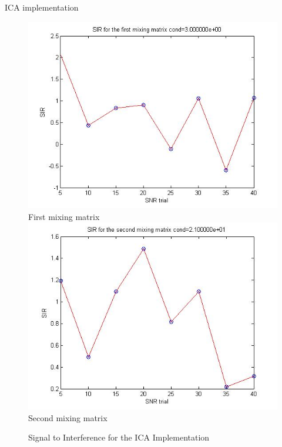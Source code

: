 \documentclass[t,12pt,english
\ifx\beamermode\undefined\else,\beamermode\fi
]{beamer}
\begin{document}
\begin{frame}{ICA implementation}

\begin{figure}[!htbp]
%
\centering
\includegraphics[width=1\textwidth]{1.jpg}\\
\tiny{First mixing matrix}\label{a1}
\endminipage\hfill
{}%
\centering
\includegraphics[width=1\textwidth]{2.jpg}\\
\tiny{Second mixing matrix}\label{a2}
\endminipage\hfill
\caption{\tiny Signal to Interference for the ICA Implementation}
\end{figure}

\end{frame}
\end{document}
